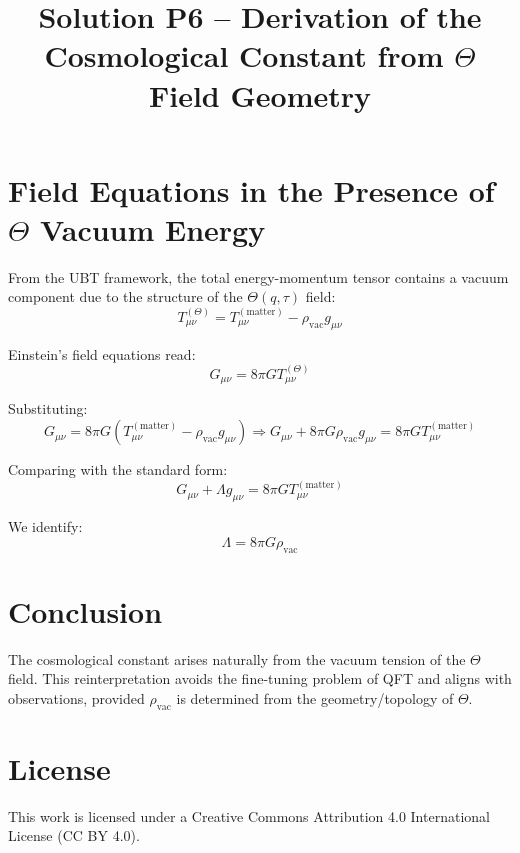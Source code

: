 \documentclass[12pt]{article}
\title{Solution P6 – Derivation of the Cosmological Constant from $\Theta$ Field Geometry}
\author{}
\date{}
\begin{document}
\maketitle

\section*{Field Equations in the Presence of $\Theta$ Vacuum Energy}

From the UBT framework, the total energy-momentum tensor contains a vacuum component due to the structure of the $\Theta(q,\tau)$ field:
\[
T_{\mu\nu}^{(\Theta)} = T_{\mu\nu}^{(\text{matter})} - \rho_{\text{vac}} g_{\mu\nu}
\]

Einstein's field equations read:
\[
G_{\mu\nu} = 8\pi G T_{\mu\nu}^{(\Theta)}
\]

Substituting:
\[
G_{\mu\nu} = 8\pi G \left( T_{\mu\nu}^{(\text{matter})} - \rho_{\text{vac}} g_{\mu\nu} \right)
\Rightarrow G_{\mu\nu} + 8\pi G \rho_{\text{vac}} g_{\mu\nu} = 8\pi G T_{\mu\nu}^{(\text{matter})}
\]

Comparing with the standard form:
\[
G_{\mu\nu} + \Lambda g_{\mu\nu} = 8\pi G T_{\mu\nu}^{(\text{matter})}
\]

We identify:
\[
\Lambda = 8\pi G \rho_{\text{vac}}
\]

\section*{Conclusion}

The cosmological constant arises naturally from the vacuum tension of the $\Theta$ field. This reinterpretation avoids the fine-tuning problem of QFT and aligns with observations, provided $\rho_{\text{vac}}$ is determined from the geometry/topology of $\Theta$.


\section*{License}
This work is licensed under a Creative Commons Attribution 4.0 International License (CC BY 4.0).
\end{document}

